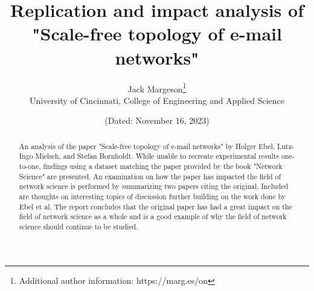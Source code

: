 \documentclass[a4paper]{article}
\title{Replication and impact analysis of\\"Scale-free topology of e-mail networks" }
\author{Jack Margeson\thanks{Additional author information: https://marg.es/on}\\
University of Cincinnati, College of Engineering and Applied Science}
\date{\normalsize{(Dated: November 16, 2023)}}
\begin{document}
\maketitle

\vspace{-3mm} %

\begin{abstract}
    An analysis of the paper "Scale-free topology of e-mail networks" by Holger Ebel, Lutz-Ingo Mielsch, and Stefan Bornholdt. While unable to recreate experimental results one-to-one, findings using a dataset matching the paper provided by the book "Network Science" are presented. An examination on how the paper has impacted the field of network science is performed by summarizing two papers citing the original. Included are thoughts on interesting topics of discussion further building on the work done by Ebel et al. The report concludes that the original paper has had a great impact on the field of network science as a whole and is a good example of why the field of network science should continue to be studied.   
\end{abstract}

\vspace{5mm} %
\end{document}
